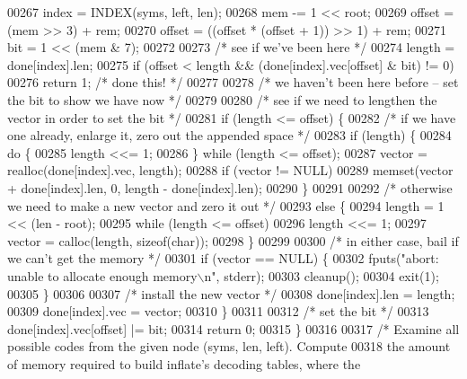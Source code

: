 \begin{DoxyCode}
00267     index = INDEX(syms, left, len);
00268     mem -= 1 << root;
00269     offset = (mem >> 3) + rem;
00270     offset = ((offset * (offset + 1)) >> 1) + rem;
00271     bit = 1 << (mem & 7);
00272 
00273     \textcolor{comment}{/* see if we've been here */}
00274     length = done[index].len;
00275     \textcolor{keywordflow}{if} (offset < length && (done[index].vec[offset] & bit) != 0)
00276         \textcolor{keywordflow}{return} 1;       \textcolor{comment}{/* done this! */}
00277 
00278     \textcolor{comment}{/* we haven't been here before -- set the bit to show we have now */}
00279 
00280     \textcolor{comment}{/* see if we need to lengthen the vector in order to set the bit */}
00281     \textcolor{keywordflow}{if} (length <= offset) \{
00282         \textcolor{comment}{/* if we have one already, enlarge it, zero out the appended space */}
00283         \textcolor{keywordflow}{if} (length) \{
00284             \textcolor{keywordflow}{do} \{
00285                 length <<= 1;
00286             \} \textcolor{keywordflow}{while} (length <= offset);
00287             vector = realloc(done[index].vec, length);
00288             \textcolor{keywordflow}{if} (vector != NULL)
00289                 memset(vector + done[index].len, 0, length - done[index].len);
00290         \}
00291 
00292         \textcolor{comment}{/* otherwise we need to make a new vector and zero it out */}
00293         \textcolor{keywordflow}{else} \{
00294             length = 1 << (len - root);
00295             \textcolor{keywordflow}{while} (length <= offset)
00296                 length <<= 1;
00297             vector = calloc(length, \textcolor{keyword}{sizeof}(\textcolor{keywordtype}{char}));
00298         \}
00299 
00300         \textcolor{comment}{/* in either case, bail if we can't get the memory */}
00301         \textcolor{keywordflow}{if} (vector == NULL) \{
00302             fputs(\textcolor{stringliteral}{"abort: unable to allocate enough memory\(\backslash\)n"}, stderr);
00303             cleanup();
00304             exit(1);
00305         \}
00306 
00307         \textcolor{comment}{/* install the new vector */}
00308         done[index].len = length;
00309         done[index].vec = vector;
00310     \}
00311 
00312     \textcolor{comment}{/* set the bit */}
00313     done[index].vec[offset] |= bit;
00314     \textcolor{keywordflow}{return} 0;
00315 \}
00316 
00317 \textcolor{comment}{/* Examine all possible codes from the given node (syms, len, left).  Compute}
00318 \textcolor{comment}{   the amount of memory required to build inflate's decoding tables, where the}

\end{DoxyCode}

